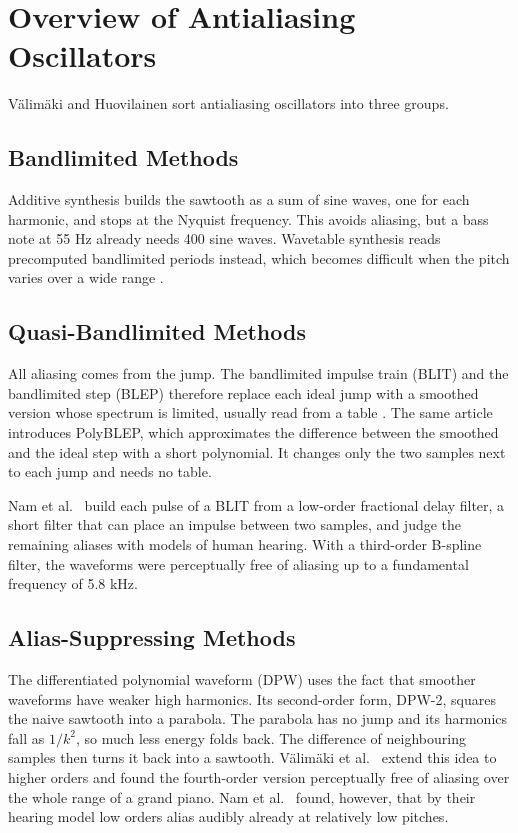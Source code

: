 \section{Overview of Antialiasing Oscillators}\label{sec:overview}

V\"alim\"aki and Huovilainen \cite{valimaki2007antialiasing} sort
antialiasing oscillators into three groups.

\subsection{Bandlimited Methods}
Additive synthesis builds the sawtooth as a sum of sine waves, one for
each harmonic, and stops at the Nyquist frequency. This avoids
aliasing, but a bass note at 55 Hz already needs 400 sine waves.
Wavetable synthesis reads precomputed bandlimited periods instead, which
becomes difficult when the pitch varies over a wide range
\cite{nam2010efficient}.

\subsection{Quasi-Bandlimited Methods}
All aliasing comes from the jump. The bandlimited impulse train (BLIT) and
the bandlimited step (BLEP) therefore replace each ideal jump with a
smoothed version whose spectrum is limited, usually read from a table
\cite{valimaki2007antialiasing}. The same article introduces PolyBLEP,
which approximates the difference between the smoothed and the ideal step
with a short polynomial. It changes only the two samples next to each
jump and needs no table.

Nam et al.\ \cite{nam2010efficient} build each pulse of a BLIT from a
low-order fractional delay filter, a short filter that can place an
impulse between two samples, and judge the remaining aliases with models
of human hearing. With a third-order
B-spline filter, the waveforms were perceptually free of aliasing up to a
fundamental frequency of 5.8 kHz.

\subsection{Alias-Suppressing Methods}
The differentiated polynomial waveform (DPW) uses the fact that smoother
waveforms have weaker high harmonics. Its second-order form, DPW-2,
squares the naive sawtooth into a parabola. The parabola has no jump and
its harmonics fall as $1/k^2$, so much less energy folds back. The
difference of neighbouring samples then turns it back into a sawtooth.
V\"alim\"aki et al.\ \cite{valimaki2010dpw} extend this idea to higher
orders and found the fourth-order version perceptually free of aliasing
over the whole range of a grand piano. Nam et al.\
\cite{nam2010efficient} found, however, that by their hearing model low
orders alias audibly already at relatively low pitches.
